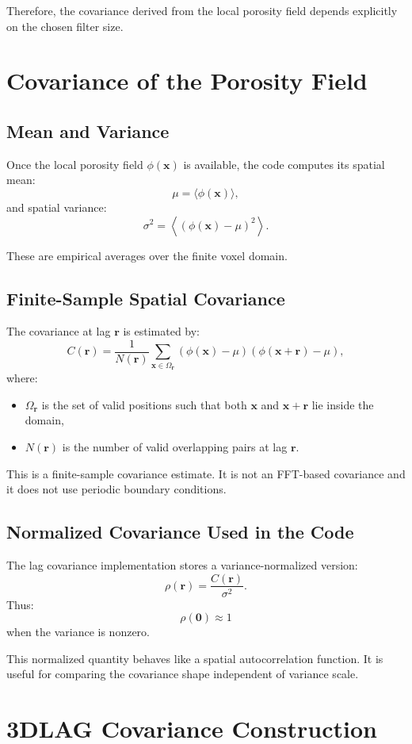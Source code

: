 \documentclass[11pt]{article}
\begin{document}
Therefore, the covariance derived from the local porosity field depends
explicitly on the chosen filter size.

\section{Covariance of the Porosity Field}
\subsection{Mean and Variance}
Once the local porosity field \(\phi(\bm{x})\) is available, the code computes
its spatial mean:
\[
\mu = \langle \phi(\bm{x}) \rangle,
\]
and spatial variance:
\[
\sigma^2
=
\left\langle \left(\phi(\bm{x})-\mu\right)^2 \right\rangle.
\]

These are empirical averages over the finite voxel domain.

\subsection{Finite-Sample Spatial Covariance}
The covariance at lag \(\bm{r}\) is estimated by:
\[
C(\bm{r})
=
\frac{1}{N(\bm{r})}
\sum_{\bm{x}\in\Omega_{\bm{r}}}
\left(\phi(\bm{x})-\mu\right)
\left(\phi(\bm{x}+\bm{r})-\mu\right),
\]
where:
\begin{itemize}
\item \(\Omega_{\bm{r}}\) is the set of valid positions such that both
\(\bm{x}\) and \(\bm{x}+\bm{r}\) lie inside the domain,
\item \(N(\bm{r})\) is the number of valid overlapping pairs at lag
\(\bm{r}\).
\end{itemize}

This is a finite-sample covariance estimate. It is not an FFT-based covariance
and it does not use periodic boundary conditions.

\subsection{Normalized Covariance Used in the Code}
The lag covariance implementation stores a variance-normalized version:
\[
\rho(\bm{r}) = \frac{C(\bm{r})}{\sigma^2}.
\]
Thus:
\[
\rho(\bm{0}) \approx 1
\]
when the variance is nonzero.

This normalized quantity behaves like a spatial autocorrelation function. It is
useful for comparing the covariance shape independent of variance scale.

\section{3DLAG Covariance Construction}
\end{document}
